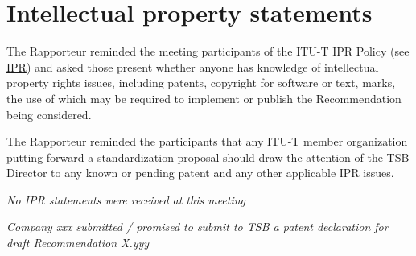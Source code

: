
\section{Intellectual property statements}\label{intellectual-property-statements}

The Rapporteur reminded the meeting participants of the ITU-T IPR Policy (see \href{https://www.itu.int/en/ITU-T/ipr/Pages/default.aspx}{IPR}) and asked those present whether anyone has knowledge of intellectual property rights issues, including patents, copyright for software or text, marks, the use of which may be required to implement or publish the Recommendation being considered.

The Rapporteur reminded the participants that any ITU-T member organization putting forward a standardization proposal should draw the attention of the TSB Director to any known or pending patent and any other applicable IPR issues.

\textit{No IPR statements were received at this meeting}

\textit{Company xxx submitted / promised to submit to TSB a patent declaration for draft Recommendation X.yyy}
